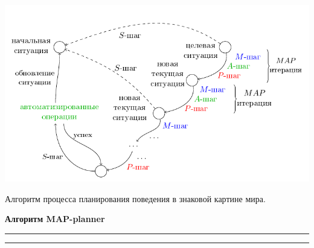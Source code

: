 \documentclass[preview,border=10pt]{standalone}
\begin{document}
	\begin{center}
		\includegraphics[width=\textwidth]{../images/algo/ru/beh_plan2_ru}
	\end{center}
	
	Алгоритм процесса планирования поведения в знаковой картине мира.
	
	\textbf{Алгоритм MAP-planner}
	\vspace*{2pt}
	\hrule
	\vspace*{1pt}
	\hrule
		
	\begin{algorithmic}[1]
		
		
		
		
		
	\end{algorithmic}
\end{document}
